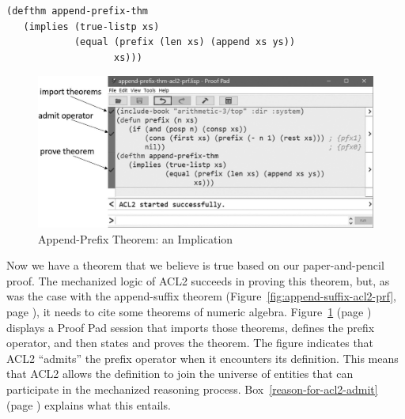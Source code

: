 \begin{code}
\begin{verbatim}
(defthm append-prefix-thm
   (implies (true-listp xs)
            (equal (prefix (len xs) (append xs ys))
                   xs)))
\end{verbatim}
\end{code}

\begin{figure}
\begin{center}
\includegraphics[scale=1]{images-cmyk/append-prefix-thm-acl2-prf-bw}
\end{center}
\caption{Append-Prefix Theorem: an Implication}
\label{fig:append-prefix-acl2-prf}
\end{figure}

Now we have a theorem that we believe is true
based on our paper-and-pencil proof.
The mechanized logic of ACL2
succeeds in proving this theorem, but, as was the case with
the append-suffix theorem
(Figure~\ref{fig:append-suffix-acl2-prf}, page \pageref{fig:append-suffix-acl2-prf}),
it needs to cite some theorems of numeric algebra.
Figure~\ref{fig:append-prefix-acl2-prf} (page \pageref{fig:append-prefix-acl2-prf})
displays a Proof Pad session that imports those theorems,
defines the prefix operator, and then states and proves the theorem.
The figure indicates that ACL2
``admits''
the prefix operator when it encounters its definition.
This means that ACL2 allows the definition to join
the universe of entities that can participate in
the mechanized reasoning process.
Box~\ref{reason-for-acl2-admit} (page \pageref{reason-for-acl2-admit})
explains what this entails.

